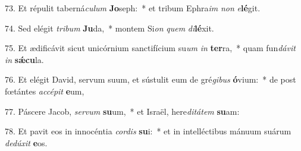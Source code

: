 73. Et répulit taberná\textit{cu}\textit{lum} \textbf{Jo}seph:~*  et tribum Ephra\textit{im} \textit{non} \textit{e}\textbf{lé}git.\

74. Sed elégit \textit{tri}\textit{bum} \textbf{Ju}da,~*  montem Si\textit{on} \textit{quem} \textit{di}\textbf{lé}xit.\

75. Et ædificávit sicut unicórnium sanctifícium su\textit{um} \textit{in} \textbf{ter}ra,~*  quam fun\textit{dá}\textit{vit} \textit{in} \textbf{sǽ}\textbf{cu}la.\

76. Et elégit David, servum suum, et sústulit eum de gré\textit{gi}\textit{bus} \textbf{ó}vium:~*  de post fœtántes \textit{ac}\textit{cé}\textit{pit} \textbf{e}um,\

77. Páscere Jacob, \textit{ser}\textit{vum} \textbf{su}um,~*  et Israël, here\textit{di}\textit{tá}\textit{tem} \textbf{su}am:\

78. Et pavit eos in innocéntia \textit{cor}\textit{dis} \textbf{su}i:~*  et in intelléctibus mánuum suárum \textit{de}\textit{dú}\textit{xit} \textbf{e}os.\

